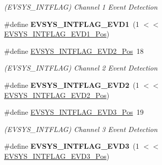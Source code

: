 \begin{DoxyCompactItemize}
\begin{DoxyCompactList}\small\item\em (E\+V\+S\+Y\+S\+\_\+\+I\+N\+T\+F\+L\+A\+G) Channel 1 Event Detection \end{DoxyCompactList}\item 
\hypertarget{group___s_a_m_l21___e_v_s_y_s_ga1345a0e8aced561748c68d33b2abb3f1}{}\#define {\bfseries E\+V\+S\+Y\+S\+\_\+\+I\+N\+T\+F\+L\+A\+G\+\_\+\+E\+V\+D1}~(1 $<$$<$ \hyperlink{group___s_a_m_l21___e_v_s_y_s_ga6ccad0fbd29790dec58a8fceb626e960}{E\+V\+S\+Y\+S\+\_\+\+I\+N\+T\+F\+L\+A\+G\+\_\+\+E\+V\+D1\+\_\+\+Pos})\label{group___s_a_m_l21___e_v_s_y_s_ga1345a0e8aced561748c68d33b2abb3f1}

\item 
\hypertarget{group___s_a_m_l21___e_v_s_y_s_ga164a8897789d4a1fd4794b5fadf3dddc}{}\#define \hyperlink{group___s_a_m_l21___e_v_s_y_s_ga164a8897789d4a1fd4794b5fadf3dddc}{E\+V\+S\+Y\+S\+\_\+\+I\+N\+T\+F\+L\+A\+G\+\_\+\+E\+V\+D2\+\_\+\+Pos}~18\label{group___s_a_m_l21___e_v_s_y_s_ga164a8897789d4a1fd4794b5fadf3dddc}

\begin{DoxyCompactList}\small\item\em (E\+V\+S\+Y\+S\+\_\+\+I\+N\+T\+F\+L\+A\+G) Channel 2 Event Detection \end{DoxyCompactList}\item 
\hypertarget{group___s_a_m_l21___e_v_s_y_s_ga6df9284235ddf3644fb9b03a80f04c31}{}\#define {\bfseries E\+V\+S\+Y\+S\+\_\+\+I\+N\+T\+F\+L\+A\+G\+\_\+\+E\+V\+D2}~(1 $<$$<$ \hyperlink{group___s_a_m_l21___e_v_s_y_s_ga164a8897789d4a1fd4794b5fadf3dddc}{E\+V\+S\+Y\+S\+\_\+\+I\+N\+T\+F\+L\+A\+G\+\_\+\+E\+V\+D2\+\_\+\+Pos})\label{group___s_a_m_l21___e_v_s_y_s_ga6df9284235ddf3644fb9b03a80f04c31}

\item 
\hypertarget{group___s_a_m_l21___e_v_s_y_s_gacd935ce4e2aa96ac822118c7f1f1575d}{}\#define \hyperlink{group___s_a_m_l21___e_v_s_y_s_gacd935ce4e2aa96ac822118c7f1f1575d}{E\+V\+S\+Y\+S\+\_\+\+I\+N\+T\+F\+L\+A\+G\+\_\+\+E\+V\+D3\+\_\+\+Pos}~19\label{group___s_a_m_l21___e_v_s_y_s_gacd935ce4e2aa96ac822118c7f1f1575d}

\begin{DoxyCompactList}\small\item\em (E\+V\+S\+Y\+S\+\_\+\+I\+N\+T\+F\+L\+A\+G) Channel 3 Event Detection \end{DoxyCompactList}\item 
\hypertarget{group___s_a_m_l21___e_v_s_y_s_gabfe3d79294684eb3f85d5807f016791f}{}\#define {\bfseries E\+V\+S\+Y\+S\+\_\+\+I\+N\+T\+F\+L\+A\+G\+\_\+\+E\+V\+D3}~(1 $<$$<$ \hyperlink{group___s_a_m_l21___e_v_s_y_s_gacd935ce4e2aa96ac822118c7f1f1575d}{E\+V\+S\+Y\+S\+\_\+\+I\+N\+T\+F\+L\+A\+G\+\_\+\+E\+V\+D3\+\_\+\+Pos})\label{group___s_a_m_l21___e_v_s_y_s_gabfe3d79294684eb3f85d5807f016791f}


\end{DoxyCompactItemize}
